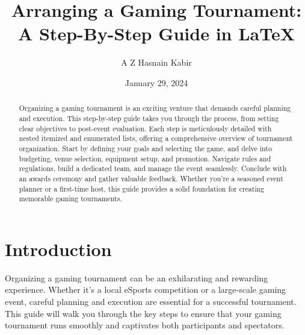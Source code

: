 \documentclass[11pt,a4paper]{article}
\title{Arranging a Gaming Tournament: A Step-By-Step Guide in \LaTeX}
\author{A Z Hasnain Kabir}
\date{January 29, 2024}
\begin{document}
	
	\maketitle
	
	\tableofcontents
	\newpage
	
	\begin{abstract}
		Organizing a gaming tournament is an exciting venture that demands careful planning and execution. This step-by-step guide takes you through the process, from setting clear objectives to post-event evaluation. Each step is meticulously detailed with nested itemized and enumerated lists, offering a comprehensive overview of tournament organization. Start by defining your goals and selecting the game, and delve into budgeting, venue selection, equipment setup, and promotion. Navigate rules and regulations, build a dedicated team, and manage the event seamlessly. Conclude with an awards ceremony and gather valuable feedback. Whether you’re a seasoned event planner or a first-time host, this guide provides a solid foundation for creating memorable gaming tournaments.
	\end{abstract}
	
	\section{Introduction}
	Organizing a gaming tournament can be an exhilarating and rewarding experience. Whether it’s a local eSports competition or a large-scale gaming event, careful planning and execution are essential for a successful tournament. This guide will walk you through the key steps to ensure that your gaming tournament runs smoothly and captivates both participants and spectators.
	
\end{document}
